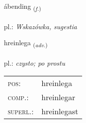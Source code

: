 \documentclass[frontgrid, backgrid]{flacards}\usepackage[]{graphicx}\usepackage[]{xcolor}
\begin{document}
\renewcommand{\blhead}{\vskip5pt {\small\bfseries\footnotesize Nafnorð | rzeczownik }}
\renewcommand{\bcfoot}{\vskip5pt \hspace{2pt}{\small\bfseries\footnotesize 3K}}


{ábending \small{\textsubscript{(\textit{f.})}} \\[1ex] %
\textphonetic{[auːpɛntiŋk]} \\
pl.: \emph{Wskazówka, sugestia} \\  [2ex]
\renewcommand*{\arraystretch}{0.8}
}

\renewcommand{\flhead}{\vskip5pt \fboxsep=0pt {\small\bfseries\footnotesize Atviksorð | przysłówek}}
\renewcommand{\fcfoot}{\vskip5pt \fboxsep=0pt \hspace{2pt}{\small\bfseries\footnotesize 3K}}

\renewcommand{\blhead}{\vskip5pt {\small\bfseries\footnotesize Atviksorð | przysłówek }}
\renewcommand{\bcfoot}{\vskip5pt \hspace{2pt}{\small\bfseries\footnotesize 3K}}


{hreinlega \small{\textsubscript{(\textit{adv.})}} \\[1ex] %
\textphonetic{[r̥eiːnlɛɣa]} \\
pl.: \emph{czysto; po prostu} \\  [2ex]
\renewcommand*{\arraystretch}{0.8}
\begin{tabular}{ll}
\textsc{pos}: & hreinlega \\ 
\textsc{comp.}: & hreinlegar \\ 
\textsc{superl.}: & hreinlegast \\
\end{tabular}
}

\renewcommand{\flhead}{\vskip5pt \fboxsep=0pt {\small\bfseries\footnotesize Lýsingarorð | przymiotnik}}
\renewcommand{\fcfoot}{\vskip5pt \fboxsep=0pt \hspace{2pt}{\small\bfseries\footnotesize 3K}}
\end{document}
